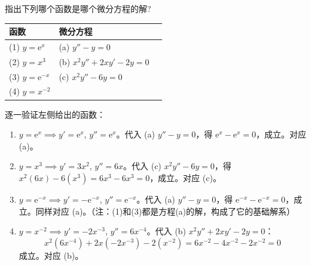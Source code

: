 \documentclass[lang=cn,11pt]{elegantbook}
\begin{document}
\begin{exercise}[函数对应微分方程]
指出下列哪个函数是哪个微分方程的解?
\begin{center}
\begin{tabular}{@{}lll@{}}
\toprule
\textbf{函数} & \textbf{微分方程} \\
\midrule
(1)  $y=\mathrm{e}^x$ & (a) $y''-y=0$ \\[6pt]
(2)  $y=x^3$ & (b) $x^2y''+2xy'-2y=0$ \\[6pt]
(3)  $y=\mathrm{e}^{-x}$ & (c) $x^2y''-6y=0$ \\[6pt]
(4)  $y=x^{-2}$ & \\
\bottomrule
\end{tabular}
\end{center}
\end{exercise}
\begin{solution}
逐一验证左侧给出的函数：
\begin{enumerate}
\item $y=\mathrm{e}^x\implies y'=\mathrm{e}^x$, $y''=\mathrm{e}^x$。代入 (a) $y''-y=0$，得 $\mathrm{e}^x-\mathrm{e}^x=0$，成立。对应 (a)。
\item $y=x^3\implies y'=3x^2$, $y''=6x$。代入 (c) $x^2y''-6y=0$，得 $x^2(6x) - 6(x^3) = 6x^3 - 6x^3 = 0$，成立。对应 (c)。
\item $y=\mathrm{e}^{-x}\implies y'=-\mathrm{e}^{-x}$, $y''=\mathrm{e}^{-x}$。代入 (a) $y''-y=0$，得 $\mathrm{e}^{-x}-\mathrm{e}^{-x}=0$，成立。同样对应 (a)。（注：(1)和(3)都是方程(a)的解，构成了它的基础解系）
\item $y=x^{-2}\implies y'=-2x^{-3}$, $y''=6x^{-4}$。代入 (b) $x^2y''+2xy'-2y=0$：$$x^2(6x^{-4}) + 2x(-2x^{-3}) - 2(x^{-2}) = 6x^{-2} - 4x^{-2} - 2x^{-2} = 0$$成立。对应 (b)。
\end{enumerate}
\end{solution}
\end{document}
